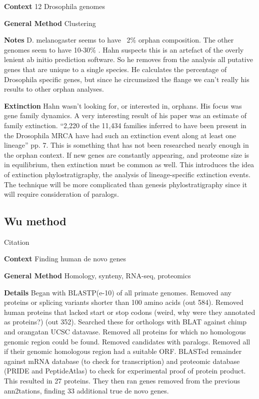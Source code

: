 \textbf{Context} 12 Drosophila genomes

\textbf{General Method} Clustering

\textbf{Notes} D. melanogaster seems to have ~2\% orphan composition. The
other genomes seem to have 10-30\% \cite{clark_evolution_2007}. Hahn
suspects this is an artefact of the overly lenient ab initio prediction
software. So he removes from the analysis all putative genes that are
unique to a single species. He calculates the percentage of Drosophila
specific genes, but since he circumsized the flange we can't really his
results to other orphan analyses. 

\textbf{Extinction} Hahn wasn't looking for, or interested in, orphans. His
focus was gene family dynamics. A very interesting result of his paper was
an estimate of family extinction. ``2,220 of the 11,434 families inferred
to have been present in the Drosophila MRCA have had such an extinction
event along at least one lineage'' pp. 7. This is something that has not
been researched nearly enough in the orphan context. If new genes are
constantly appearing, and proteome size is in equilibrium, then extinction
must be common as well. This introduces the idea of extinction
phylostratigraphy, the analysis of lineage-specific extinction events. The
technique will be more complicated than genesis phylostratigraphy since it
will require consideration of paralogs.

\subsection{Wu method}

Citation \cite{wu_novo_2011}

\textbf{Context} Finding human de novo genes

\textbf{General Method} Homology, synteny, RNA-seq, proteomics

\textbf{Details} Began with BLASTP(e-10) of all primate genomes. Removed
any proteins or splicing variants shorter than 100 amino acids (out 584).
Removed human proteins that lacked start or stop codons (weird, why were
they annotated as proteins?) (out 352). Searched these for orthologs with
BLAT against chimp and orangatan UCSC datavase. Removed all proteins for
which no homologous genomic region could be found. Removed candidates with
paralogs. Removed all if their genomic homologous region had a suitable
ORF. BLASTed remainder against mRNA database (to check for transcription)
and proteomic database (PRIDE and PeptideAtlas) to check for experimental
proof of protein product. This resulted in 27 proteins. They then ran genes
removed from the previous ann2tations, finding 33 additional true de novo
genes.

